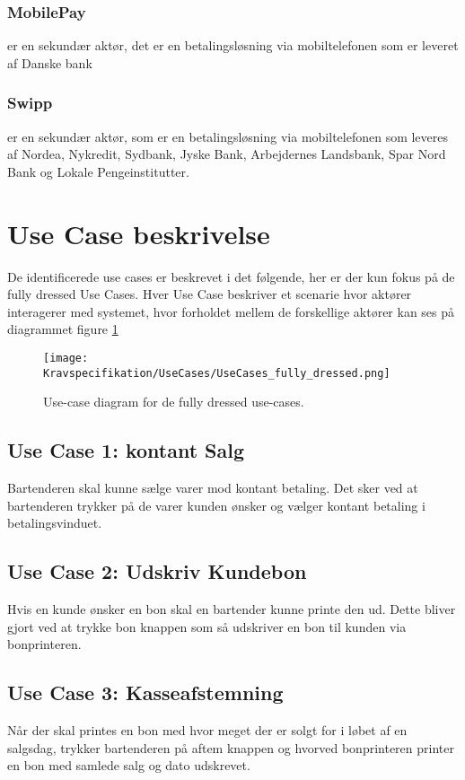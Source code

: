 \subsubsection*{MobilePay} 
er en sekundær aktør, det er en betalingsløsning via mobiltelefonen som er leveret af Danske bank

\subsubsection*{Swipp} 
er en sekundær aktør, som er en betalingsløsning via mobiltelefonen som leveres af Nordea, Nykredit, Sydbank, Jyske Bank, Arbejdernes Landsbank, Spar Nord Bank og Lokale Pengeinstitutter.  

\newpage

\section{Use Case beskrivelse}
De identificerede use cases er beskrevet i det følgende, her er der kun fokus på de fully dressed Use Cases. Hver Use Case beskriver et scenarie hvor aktører interagerer med systemet, hvor forholdet mellem de forskellige aktører kan ses på diagrammet figure \ref{fig:fullydressedusecases}

\begin{figure}[H]
	\centering
	\texttt{[image: Kravspecifikation/UseCases/UseCases\_fully\_dressed.png]}
	\caption{Use-case diagram for de fully dressed use-cases.}
	\label{fig:fullydressedusecases}
\end{figure} 

\subsection*{Use Case 1: kontant Salg}
Bartenderen skal kunne sælge varer mod kontant betaling. Det sker ved at bartenderen trykker på de varer kunden ønsker og vælger kontant betaling i betalingsvinduet. 


\subsection*{Use Case 2: Udskriv Kundebon}
Hvis en kunde ønsker en bon skal en bartender kunne printe den ud. Dette bliver gjort ved at trykke bon knappen som så udskriver en bon til kunden via bonprinteren.  

\subsection*{Use Case 3: Kasseafstemning}
Når der skal printes en bon med hvor meget der er solgt for i løbet af en salgsdag, trykker bartenderen på aftem knappen og hvorved bonprinteren printer en bon med samlede salg og dato udskrevet. 

